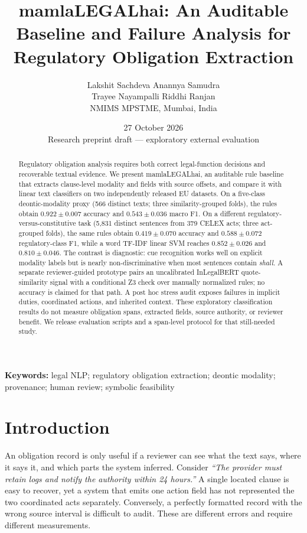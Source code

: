 \documentclass[11pt,a4paper]{article}
\title{\bfseries mamlaLEGALhai: An Auditable Baseline and Failure Analysis for Regulatory Obligation Extraction}
\author{Lakshit Sachdeva \quad Anannya Samudra\\
Trayee Nayampalli \quad Riddhi Ranjan\\[0.35em]
\small NMIMS MPSTME, Mumbai, India}
\date{27 October 2026\\[0.25em]\small Research preprint draft --- exploratory external evaluation}
\newcommand{\system}{\textsf{mamlaLEGALhai}}
\begin{document}
\maketitle
\begin{abstract}
Regulatory obligation analysis requires both correct legal-function decisions and recoverable textual evidence. We present \system, an auditable rule baseline that extracts clause-level modality and fields with source offsets, and compare it with linear text classifiers on two independently released EU datasets. On a five-class deontic-modality proxy (566 distinct texts; three similarity-grouped folds), the rules obtain $0.922\pm0.007$ accuracy and $0.543\pm0.036$ macro F1. On a different regulatory-versus-constitutive task (5,831 distinct sentences from 379 CELEX acts; three act-grouped folds), the same rules obtain $0.419\pm0.070$ accuracy and $0.588\pm0.072$ regulatory-class F1, while a word TF-IDF linear SVM reaches $0.852\pm0.026$ and $0.810\pm0.046$. The contrast is diagnostic: cue recognition works well on explicit modality labels but is nearly non-discriminative when most sentences contain \emph{shall}. A separate reviewer-guided prototype pairs an uncalibrated InLegalBERT quote-similarity signal with a conditional Z3 check over manually normalized rules; no accuracy is claimed for that path. A post hoc stress audit exposes failures in implicit duties, coordinated actions, and inherited context. These exploratory classification results do not measure obligation spans, extracted fields, source authority, or reviewer benefit. We release evaluation scripts and a span-level protocol for that still-needed study.
\end{abstract}
\noindent\textbf{Keywords:} legal NLP; regulatory obligation extraction; deontic modality; provenance; human review; symbolic feasibility

\section{Introduction}
An obligation record is only useful if a reviewer can see what the text says, where it says it, and which parts the system inferred. Consider \emph{``The provider must retain logs and notify the authority within 24 hours.''} A single located clause is easy to recover, yet a system that emits one action field has not represented the two coordinated acts separately. Conversely, a perfectly formatted record with the wrong source interval is difficult to audit. These are different errors and require different measurements.
\end{document}
